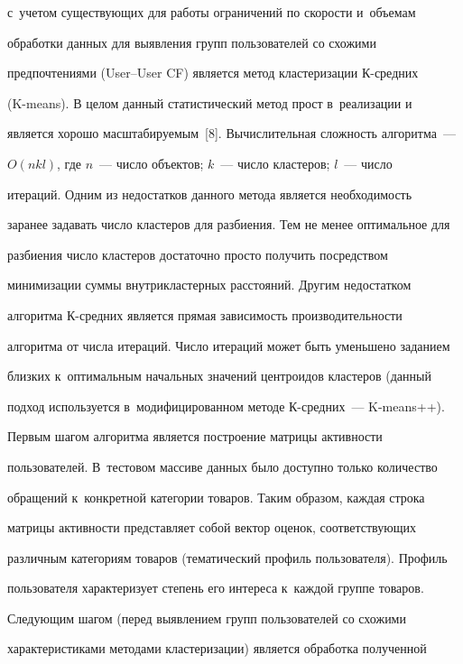 с~учетом существующих для работы ограничений по скорости и~объемам 


обработки данных для выявления групп пользователей со схожими 


предпочтениями (User--User CF) является метод кластеризации К-сред\-них  


(K-means). В целом данный статистический метод прост в~реализации и~


является хорошо масштабируемым~[8]. Вычислительная сложность алгоритма~--- 


$O(nkl)$, где $n$~--- число объектов; $k$~--- число кластеров; $l$~--- число 


итераций. Одним из недостатков данного метода является необходимость 


заранее задавать число кластеров для разбиения. Тем не менее оптимальное для 


разбиения число кластеров достаточно просто получить посредством 


минимизации суммы внутрикластерных расстояний. Другим не\-до\-стат\-ком 


алгоритма К-сред\-них является прямая зависимость производительности 


алгоритма от числа итераций. Число итераций может быть уменьшено заданием 


близких к~оптимальным начальных значений центроидов кластеров (данный 


подход используется в~модифицированном методе К-сред\-них~--- K-means++).


  


  Первым шагом алгоритма является построение матрицы активности 


пользователей. В~тестовом массиве данных было доступно только количество 


обращений к~конкретной категории товаров. Таким образом, каждая строка 


матрицы активности представляет собой вектор оценок, соответствующих 


различным категориям товаров (тематический профиль пользователя). Профиль 


пользователя характеризует степень его интереса к~каждой группе товаров. 


  


  Следующим шагом (перед выявлением групп пользователей со схожими 


характеристиками методами кластеризации) является обработка полученной 


